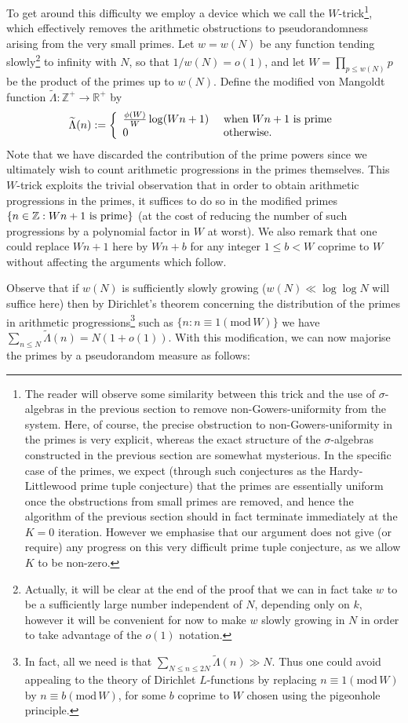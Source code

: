 \documentclass[12pt,a4paper,reqno]{amsart}
\numberwithin{equation}{section}
\theoremstyle{plain}
\theoremstyle{definition}
\renewcommand{\leq}{\leqslant}
\newcommand{\md}[1]{\ensuremath{(\mbox{mod}\, #1)}}
\def\Z{{\mathbb Z}}
\def\R{{\mathbb R}}
\def\w{w}
\def\vs{\vspace{11pt}}
\def\ni{\noindent}
\begin{document}
\ni To get around this difficulty we employ a device which we call the $W$-trick\footnote{The reader will observe some similarity between this trick and the use of $\sigma$-algebras in the previous section to remove non-Gowers-uniformity from the system.  Here, of course, the precise obstruction to non-Gowers-uniformity in the primes is very explicit, whereas the exact structure of the $\sigma$-algebras constructed in the previous section are somewhat mysterious.  In the specific case of the primes, we expect (through such conjectures as the Hardy-Littlewood prime tuple conjecture) that the primes are essentially uniform once the obstructions from small primes are removed, and hence the algorithm of the previous section should in fact terminate immediately at the $K=0$ iteration.  However we emphasise that our argument does not give (or require) any progress on this very difficult prime tuple conjecture, as we allow $K$ to be non-zero.}, which effectively removes the arithmetic
obstructions to pseudorandomness arising from the very small primes. Let $\w = \w(N)$ be any function tending 
slowly\footnote{Actually, it will be clear at the end of the proof that we can in fact take $\w$ to be a sufficiently large
number independent of $N$, depending only on $k$, however it will be convenient for now to make $\w$ slowly growing in $N$ in order
to take advantage of the $o(1)$ notation.} to infinity with $N$, so that $1/\w(N) = o(1)$, and let $W = \prod_{p \leq \w(N)} p$ be the product of the primes up to $\w(N)$. Define the modified von Mangoldt function $\tilde \Lambda: \Z^+ \to \R^+$ by
\[ \widetilde{\Lambda}(n) := \left\{
\begin{array}{ll}
\frac{\phi(W)}{W} \log(Wn + 1) & \hbox{ when } Wn+1 \hbox{ is prime}\\
0 & \hbox{ otherwise.}
\end{array}\right.\]
Note that we have discarded the contribution of the prime powers since we ultimately wish to count arithmetic progressions in
the primes themselves.  This $W$-trick exploits the trivial observation that in order to obtain arithmetic progressions in the primes,
it suffices to do so in the modified primes $\{ n \in \Z: Wn+1 \hbox{ is prime} \}$ (at the cost of reducing the number of such progressions by a polynomial factor in $W$ at worst).  We also remark that one could replace $Wn+1$ here by $Wn+b$ for any 
integer $1 \leq b < W$ coprime to $W$ without affecting the arguments which follow.\vs

\ni Observe that if $\w(N)$ is sufficiently slowly growing ($\w(N) \ll \log \log N$ will suffice here) then by Dirichlet's theorem concerning
the distribution of the primes in arithmetic progressions\footnote{In fact, all we need is that $\sum_{N \leq n \leq 2N} \widetilde{\Lambda}(n) \gg N$. Thus one could avoid appealing to the theory of Dirichlet $L$-functions by replacing $n \equiv 1 \md{W}$ by $n \equiv b \md{W}$, for some $b$ coprime to $W$ chosen using the pigeonhole principle.} such as $\{ n: n \equiv 1 \md{W} \}$ we have $\sum_{n \leq N} \widetilde{\Lambda}(n) = N(1 + o(1))$.  With this modification, we can now majorise the primes by a pseudorandom
measure as follows:
\end{document}
